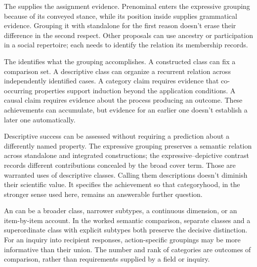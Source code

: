 \documentclass[12pt]{article}
\begin{document}
The  supplies the assignment evidence. Prenominal
 enters the expressive grouping because of its conveyed
stance, while its position inside  supplies
grammatical evidence. Grouping it with standalone  for
the first reason doesn't erase their difference in the second respect.
Other proposals can use ancestry or participation in a social repertoire;
each needs to identify the relation its membership records.

The  identifies what the grouping accomplishes. A
constructed class can fix a comparison set. A descriptive class can
organize a recurrent relation across independently identified cases.
A category claim requires evidence that co-occurring properties support
induction beyond the application conditions. A causal claim requires
evidence about the process producing an outcome. These achievements
can accumulate, but evidence for an earlier one doesn't establish a
later one automatically.

Descriptive success can be assessed without requiring a prediction about
a differently named property. The expressive grouping preserves a semantic relation across
standalone and integrated constructions; the expressive--depictive contrast
records different contributions concealed by the broad cover term.
Those are warranted uses of descriptive classes. Calling them descriptions
doesn't diminish their scientific value. It specifies the achievement
so that categoryhood, in the stronger sense used here, remains an
answerable further question.

An  can be a broader class, narrower subtypes, a
continuous dimension, or an item-by-item account. In the worked semantic
comparison, separate classes and a superordinate class with explicit
subtypes both preserve the decisive distinction. For an inquiry into
recipient responses, action-specific groupings may be more informative
than their union. The number and rank of categories are outcomes of
comparison, rather than requirements supplied by a field or inquiry.
\end{document}
